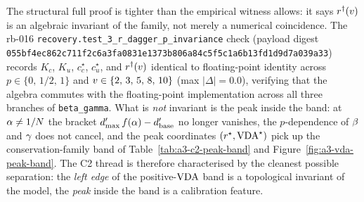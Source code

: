 The structural full proof is tighter than the empirical witness
allows: it says $r^{\dagger}(v)$ is an algebraic invariant of the
family, not merely a numerical coincidence. The rb-016
\texttt{recovery.test\_3\_r\_dagger\_p\_invariance} check
(payload digest
\texttt{055bf4ec862c711f2c6a3fa0831e1373b806a84c5f5c1a6b13fd1d9d7a039a33})
records $K_c$, $K_u$, $c_c^\star$, $c_u^\star$, and
$r^{\dagger}(v)$ identical to floating-point identity across
$p \in \{0,\, 1/2,\, 1\}$ and
$v \in \{2,\, 3,\, 5,\, 8,\, 10\}$ (max $|\Delta| = 0.0$),
verifying that the algebra commutes with the floating-point
implementation across all three branches of \texttt{beta\_gamma}.
What is \emph{not} invariant is the peak inside the band: at
$\alpha \ne 1/N$ the bracket
$d'_{\max}\,f(\alpha) - d'_{\mathrm{base}}$ no longer
vanishes, the $p$-dependence of $\beta$ and $\gamma$ does not
cancel, and the peak coordinates
$(r^\star, \mathrm{VDA}^\star)$ pick up the conservation-family band
of Table~\ref{tab:a3-c2-peak-band} and
Figure~\ref{fig:a3-vda-peak-band}. The C2 thread is therefore
characterised by the cleanest possible separation: the
\emph{left edge} of the positive-$\mathrm{VDA}$ band is a topological
invariant of the model, the \emph{peak} inside the band is a
calibration feature.

